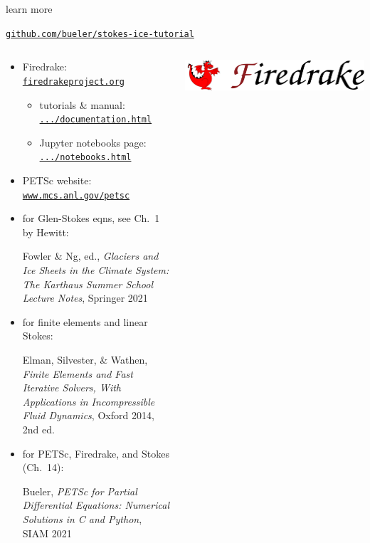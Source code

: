 \documentclass[10pt,hyperref,dvipsnames]{beamer}
\begin{document}
\begin{frame}{learn more}

\centerline{\large \href{https://github.com/bueler/stokes-ice-tutorial}{\alert{\texttt{github.com/bueler/stokes-ice-tutorial}}}}

\medskip
\hrulefill


\begin{columns}
\begin{column}{0.6\textwidth}
\small

\begin{itemize}
\item Firedrake: \href{https://www.firedrakeproject.org/}{\texttt{firedrakeproject.org}}

    \begin{itemize}
    \scriptsize
    \item tutorials \& manual: \href{https://www.firedrakeproject.org/documentation.html}{\texttt{.../documentation.html}}
    \item Jupyter notebooks page: \href{https://www.firedrakeproject.org/notebooks.html}{\texttt{.../notebooks.html}}
    \end{itemize}
\item PETSc website: \href{https://www.mcs.anl.gov/petsc/}{\texttt{www.mcs.anl.gov/petsc}}
\item for Glen-Stokes eqns, see Ch.~1 by Hewitt:


{\scriptsize Fowler \& Ng, ed., \emph{Glaciers and Ice Sheets in the Climate System: The Karthaus Summer School Lecture Notes}, Springer 2021}

\item for finite elements and linear Stokes:

{\scriptsize Elman, Silvester, \& Wathen, \emph{Finite Elements and Fast Iterative Solvers, With Applications in Incompressible Fluid Dynamics}, Oxford 2014, 2nd ed.}

\item for PETSc, Firedrake, and Stokes (Ch.~14):

{\scriptsize Bueler, \emph{PETSc for Partial Differential Equations: Numerical Solutions in C and Python}, SIAM 2021}
\end{itemize}
\end{column}

\begin{column}{0.4\textwidth}

\bigskip
\href{https://www.firedrakeproject.org/}{\includegraphics[width=\textwidth]{figs/firedrakebanner.png}}


\end{column}
\end{columns}
\end{frame}
\end{document}
